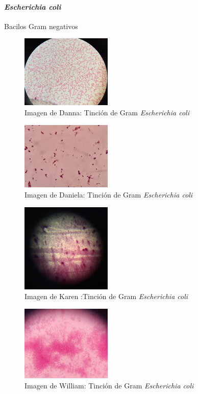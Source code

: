 \documentclass[journal,transmag]{IEEEtran}
\begin{document}
\vspace{20mm} 
\paragraph{\large \textit{\textbf{Escherichia coli}}}Bacilos Gram negativos 

	\begin{figure}[!h] 
	\center 
	\includegraphics[width=4.3cm]{I2.png} 
	\caption{Imagen de Danna: Tinción de Gram \textit{Escherichia coli} } 
	\label{I1}
	\end{figure} 
	\begin{figure}[!h] 
	\center 
	\includegraphics[width=4.3cm]{I6.jpg} 
	\caption{Imagen de Daniela: Tinción de Gram \textit{Escherichia coli} } 
	\label{I1}
	\end{figure} 
	\begin{figure}[!h] 
	\center 
	\includegraphics[width=4.3cm]{I10.png} 
	\caption{Imagen de Karen :Tinción de Gram \textit{Escherichia coli} } 
	\label{I1}
	\end{figure} 
	\begin{figure}[!h] 
	\center 
	\includegraphics[width=4.3cm]{I14.jpg} 
	\caption{Imagen de William: Tinción de Gram \textit{Escherichia coli} } 
	\label{I1}
	\end{figure} 
\end{document}
